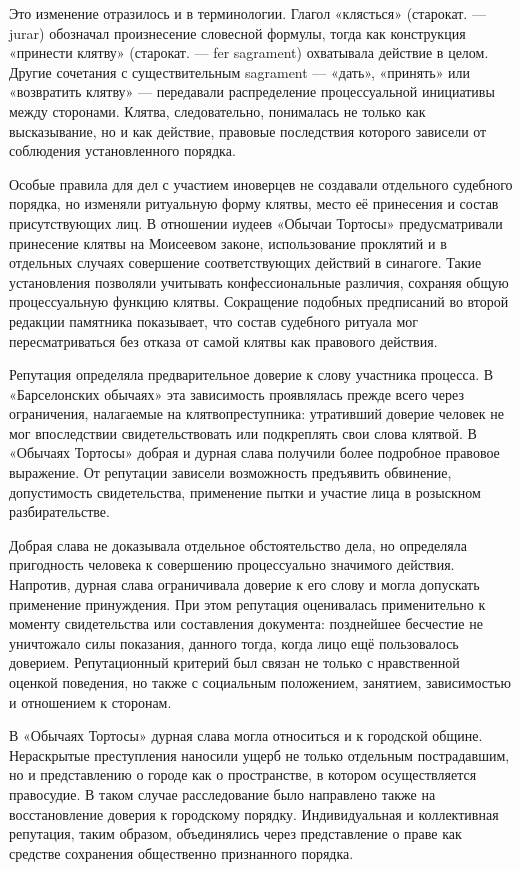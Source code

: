Это изменение отразилось и в терминологии. Глагол «клясться» (старокат. --- jurar) обозначал произнесение словесной формулы, тогда как конструкция «принести клятву» (старокат. --- fer sagrament) охватывала действие в целом. Другие сочетания с существительным sagrament --- «дать», «принять» или «возвратить клятву» --- передавали распределение процессуальной инициативы между сторонами. Клятва, следовательно, понималась не только как высказывание, но и как действие, правовые последствия которого зависели от соблюдения установленного порядка.

Особые правила для дел с участием иноверцев не создавали отдельного судебного порядка, но изменяли ритуальную форму клятвы, место её принесения и состав присутствующих лиц. В отношении иудеев «Обычаи Тортосы» предусматривали принесение клятвы на Моисеевом законе, использование проклятий и в отдельных случаях совершение соответствующих действий в синагоге. Такие установления позволяли учитывать конфессиональные различия, сохраняя общую процессуальную функцию клятвы. Сокращение подобных предписаний во второй редакции памятника показывает, что состав судебного ритуала мог пересматриваться без отказа от самой клятвы как правового действия.

Репутация определяла предварительное доверие к слову участника процесса. В «Барселонских обычаях» эта зависимость проявлялась прежде всего через ограничения, налагаемые на клятвопреступника: утративший доверие человек не мог впоследствии свидетельствовать или подкреплять свои слова клятвой. В «Обычаях Тортосы» добрая и дурная слава получили более подробное правовое выражение. От репутации зависели возможность предъявить обвинение, допустимость свидетельства, применение пытки и участие лица в розыскном разбирательстве.

Добрая слава не доказывала отдельное обстоятельство дела, но определяла пригодность человека к совершению процессуально значимого действия. Напротив, дурная слава ограничивала доверие к его слову и могла допускать применение принуждения. При этом репутация оценивалась применительно к моменту свидетельства или составления документа: позднейшее бесчестие не уничтожало силы показания, данного тогда, когда лицо ещё пользовалось доверием. Репутационный критерий был связан не только с нравственной оценкой поведения, но также с социальным положением, занятием, зависимостью и отношением к сторонам.

В «Обычаях Тортосы» дурная слава могла относиться и к городской общине. Нераскрытые преступления наносили ущерб не только отдельным пострадавшим, но и представлению о городе как о пространстве, в котором осуществляется правосудие. В таком случае расследование было направлено также на восстановление доверия к городскому порядку. Индивидуальная и коллективная репутация, таким образом, объединялись через представление о праве как средстве сохранения общественно признанного порядка.

